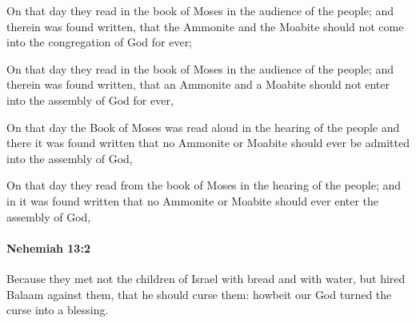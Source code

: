 			On that day they read in the book of Moses in the audience of the people; and therein was found written, that the Ammonite and the Moabite should not come into the congregation of God for ever;

			\begin{versebox}
					\item[BHS] 
					\item[LXX] 
					\item[ASV] On that day they read in the book of Moses in the audience of the people; and therein was found written, that an Ammonite and a Moabite should not enter into the assembly of God for ever,
					\item[NIV] On that day the Book of Moses was read aloud in the hearing of the people and there it was found written that no Ammonite or Moabite should ever be admitted into the assembly of God,
					\item[NRSV] On that day they read from the book of Moses in the hearing of the people; and in it was found written that no Ammonite or Moabite should ever enter the assembly of God,
			\end{versebox}

		\paragraph{Nehemiah 13:2} %
			\label{NEHEMIAH-13-2}

			Because they met not the children of Israel with bread and with water, but hired Balaam against them, that he should curse them: howbeit our God turned the curse into a blessing.

